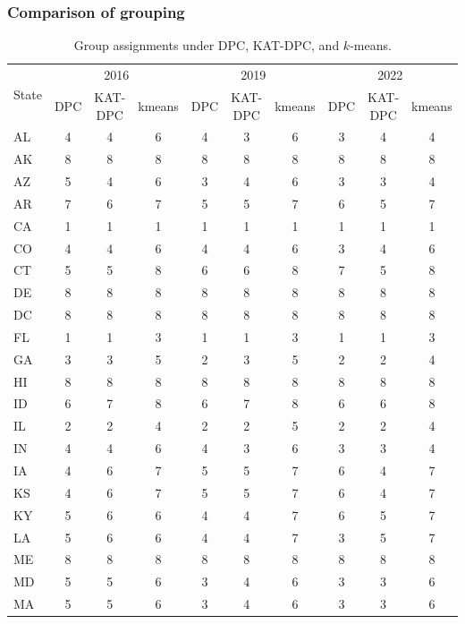 \documentclass{article}
\begin{document}
\subsubsection{Comparison of grouping}
\begin{table}[H]
\centering
\caption{Group assignments under DPC, KAT-DPC, and $k$-means.\label{tab:group-cmp}}
\scriptsize
\setlength{\tabcolsep}{2.5pt}
\begin{tabular}{l*{9}{c}}
\toprule
\multirow{2}{*}{State} & \multicolumn{3}{c}{2016} & \multicolumn{3}{c}{2019} & \multicolumn{3}{c}{2022} \\
\cmidrule(lr){2-4}\cmidrule(lr){5-7}\cmidrule(lr){8-10}
 & DPC & KAT-DPC & kmeans & DPC & KAT-DPC & kmeans & DPC & KAT-DPC & kmeans \\
\midrule
AL & 4 & 4 & 6 & 4 & 3 & 6 & 3 & 4 & 4 \\
AK & 8 & 8 & 8 & 8 & 8 & 8 & 8 & 8 & 8 \\
AZ & 5 & 4 & 6 & 3 & 4 & 6 & 3 & 3 & 4 \\
AR & 7 & 6 & 7 & 5 & 5 & 7 & 6 & 5 & 7 \\
CA & 1 & 1 & 1 & 1 & 1 & 1 & 1 & 1 & 1 \\
CO & 4 & 4 & 6 & 4 & 4 & 6 & 3 & 4 & 6 \\
CT & 5 & 5 & 8 & 6 & 6 & 8 & 7 & 5 & 8 \\
DE & 8 & 8 & 8 & 8 & 8 & 8 & 8 & 8 & 8 \\
DC & 8 & 8 & 8 & 8 & 8 & 8 & 8 & 8 & 8 \\
FL & 1 & 1 & 3 & 1 & 1 & 3 & 1 & 1 & 3 \\
GA & 3 & 3 & 5 & 2 & 3 & 5 & 2 & 2 & 4 \\
HI & 8 & 8 & 8 & 8 & 8 & 8 & 8 & 8 & 8 \\
ID & 6 & 7 & 8 & 6 & 7 & 8 & 6 & 6 & 8 \\
IL & 2 & 2 & 4 & 2 & 2 & 5 & 2 & 2 & 4 \\
IN & 4 & 4 & 6 & 4 & 3 & 6 & 3 & 3 & 4 \\
IA & 4 & 6 & 7 & 5 & 5 & 7 & 6 & 4 & 7 \\
KS & 4 & 6 & 7 & 5 & 5 & 7 & 6 & 4 & 7 \\
KY & 5 & 6 & 6 & 4 & 4 & 7 & 6 & 5 & 7 \\
LA & 5 & 6 & 6 & 4 & 4 & 7 & 3 & 5 & 7 \\
ME & 8 & 8 & 8 & 8 & 8 & 8 & 8 & 8 & 8 \\
MD & 5 & 5 & 6 & 3 & 4 & 6 & 3 & 3 & 6 \\
MA & 5 & 5 & 6 & 3 & 4 & 6 & 3 & 3 & 6 \\

\end{tabular}
\end{table}
\end{document}
